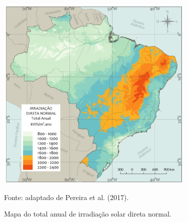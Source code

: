 \begin{onehalfspace}
        \begin{figure}[ht]
            \centering
            \caption{\small Mapa do total anual de irradiação solar direta normal.}
            \includegraphics[width=0.85\textwidth]{figures/fig4-mapa2.png}
            \begin{flushleft}
                \par \small Fonte: adaptado de Pereira et al. (2017).            
            \end{flushleft}
            \label{Figura 3}
        \end{figure}\vspace*{-0.4cm}


\end{onehalfspace}
